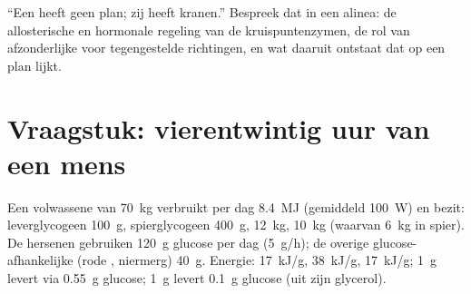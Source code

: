 \begin{exercise}[$\star\star\star$]\label{exo:b1:biosyntheses-integration:12}
``Een  heeft geen plan; zij heeft kranen.'' Bespreek dat in een alinea: de
allosterische en hormonale regeling van de kruispuntenzymen, de rol van
afzonderlijke  voor tegengestelde richtingen, en wat daaruit ontstaat dat op
een plan lijkt.
\end{exercise}

\section{Vraagstuk: vierentwintig uur van een mens}

\begin{problem}
\label{pb:b1:biosyntheses-integration:1}
Een volwassene van \qty{70}{kg} verbruikt per dag \qty{8.4}{MJ} (gemiddeld
\qty{100}{W}) en bezit: leverglycogeen \qty{100}{g}, spierglycogeen \qty{400}{g},
 \qty{12}{kg},  \qty{10}{kg} (waarvan \qty{6}{kg} in spier). De hersenen
gebruiken \qty{120}{g} glucose per dag (\qty{5}{g/h}); de overige
glucose-afhankelijke  (rode , niermerg) \qty{40}{g}. Energie:
 \qty{17}{kJ/g},  \qty{38}{kJ/g},  \qty{17}{kJ/g}; \qty{1}{g}
 levert via  \qty{0.55}{g} glucose; \qty{1}{g}  levert
\qty{0.1}{g} glucose (uit zijn glycerol).


\end{problem}
